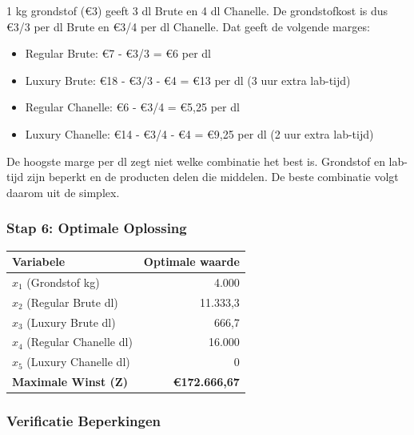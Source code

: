 \documentclass[a4paper,11pt]{article}
\begin{document}
\begin{oefenblok}
    1 kg grondstof (€3) geeft 3 dl Brute en 4 dl Chanelle. De grondstofkost is dus €3/3 per dl Brute en €3/4 per dl Chanelle. Dat geeft de volgende marges:
    \begin{itemize}
        \item Regular Brute: €7 - €3/3 = €6 per dl
        \item Luxury Brute: €18 - €3/3 - €4 = €13 per dl (3 uur extra lab-tijd)
        \item Regular Chanelle: €6 - €3/4 = €5,25 per dl
        \item Luxury Chanelle: €14 - €3/4 - €4 = €9,25 per dl (2 uur extra lab-tijd)
    \end{itemize}
    De hoogste marge per dl zegt niet welke combinatie het best is. Grondstof en lab-tijd zijn beperkt en de producten delen die middelen. De beste combinatie volgt daarom uit de simplex.

    \subsubsection*{Stap 6: Optimale Oplossing}

    \begin{center}
        \begin{tabular}{|l|r|}
            \hline
            \textbf{Variabele}          & \textbf{Optimale waarde} \\
            \hline
            $x_1$ (Grondstof kg)        & 4.000                    \\
            \hline
            $x_2$ (Regular Brute dl)    & 11.333,3                 \\
            \hline
            $x_3$ (Luxury Brute dl)     & 666,7                    \\
            \hline
            $x_4$ (Regular Chanelle dl) & 16.000                   \\
            \hline
            $x_5$ (Luxury Chanelle dl)  & 0                        \\
            \hline
            \hline
            \textbf{Maximale Winst (Z)} & \textbf{€172.666,67}     \\
            \hline
        \end{tabular}
    \end{center}

    \subsubsection*{Verificatie Beperkingen}


\end{oefenblok}
\end{document}
